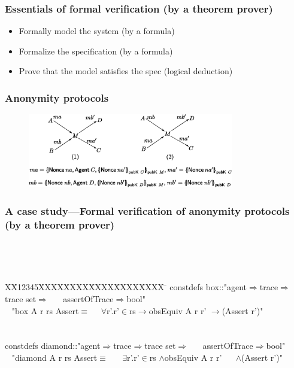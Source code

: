 \documentclass{beamer}
\newlength{\fminilength}
\newenvironment{fmini}[1][\linewidth]
  {\setlength{\fminilength}{#1\fboxsep-2\fboxrule}%
   \vspace{2ex}\noindent\begin{lrbox}{\fminibox}\begin{minipage}{\fminilength}%
   \mbox{ }\hfill\vspace{-2.5ex}}%
  {\end{minipage}\end{lrbox}\vspace{1ex}\hspace{0ex}%
   \framebox{\usebox{\fminibox}}}
\newenvironment{specification}
{\noindent\scriptsize
\tt\begin{fmini}\begin{tabbing}X\=X12345\=XXXX\=XXXX\=XXXX\=XXXX\=XXXX
\=\+\kill} {\end{tabbing}\normalfont\end{fmini}}
\begin{document}
\begin{frame}\frametitle{Essentials of formal verification (by a theorem prover)}


\begin{itemize}
\item Formally model the system (by a  formula)
\item Formalize the specification (by a  formula)
\item Prove that the model satisfies the spec (logical deduction)
\end{itemize}
\end{frame}

\begin{frame}\frametitle{Anonymity protocols}
\begin{figure}[tbp]
\begin{center}
\includegraphics[width=0.8\textwidth]{figPdf.pdf}
\end{center}
\end{figure}
\end{frame}

\begin{frame}\frametitle{A case study---Formal verification of anonymity protocols (by a theorem prover)}


 \begin{specification}
constdefs box::"agent$\Rightarrow$trace$\Rightarrow$trace set$\Rightarrow$
~~ assertOfTrace$\Rightarrow$bool" \\
~ "box A r rs Assert$\equiv$
 ~~$\forall$r'.r'$\in$rs$\longrightarrow$obsEquiv A  r r' $\longrightarrow$(Assert r')" \\

  \\
\\
constdefs diamond::"agent$\Rightarrow$trace$\Rightarrow$trace set$\Rightarrow$
  ~~ assertOfTrace$\Rightarrow$bool" \\
~ "diamond A r rs Assert$\equiv$
  ~~ $\exists$r'.r'$\in$rs
  $\wedge$obsEquiv A  r r'
~~ $\wedge$(Assert r')"
 \end{specification}


\end{frame}
\end{document}
